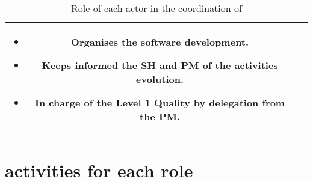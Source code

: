 \begin{table}[H]
\begin{tabular}{|c|p{14cm}|}
\begin{minipage}[l]{14cm}
\begin{itemize}
\itemsep-5pt
\item Organises the software development.
\item Keeps informed the SH and PM of the activities evolution.
\item In charge of the Level 1 Quality by delegation from the PM.
\end{itemize}
\end{minipage}\\
\hline
\end{tabular}
\caption{\label{coord} Role of each actor in the coordination of \telemacsystem}
\end{table}

\section{\telemacsystem activities for each role}

